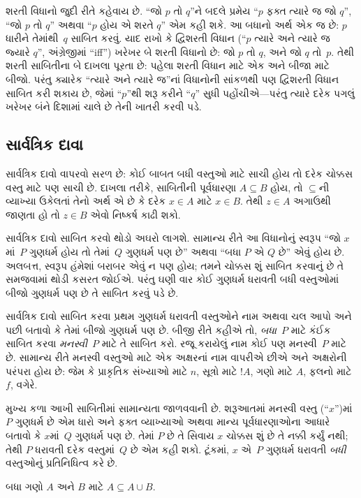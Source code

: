 શરતી વિધાનો જુદી રીતે કહેવાય છે. ``જો $p$ તો $q$''ને બદલે
પ્રમેય ``$p$ ફક્ત ત્યારે જ જો $q$'', ``જો $p$ તો $q$'' અથવા
``$p$ હોય એ શરતે $q$'' એમ કહી શકે. આ બધાનો અર્થ એક જ છે:
$p$ ધારીને તેમાંથી~$q$ સાબિત કરવું. યાદ રાખો કે દ્વિશરતી
વિધાન (``$p$ ત્યારે અને ત્યારે જ જ્યારે $q$'', અંગ્રેજીમાં ``iff'') ખરેખર બે
શરતી વિધાનો છે: જો $p$ તો $q$, અને જો $q$ તો~$p$. તેથી
શરતી સાબિતીના બે દાખલા પૂરતા છે: પહેલા શરતી વિધાન માટે એક
અને બીજા માટે બીજો. પરંતુ ક્યારેક ``ત્યારે અને ત્યારે જ''નાં
વિધાનોની સાંકળથી પણ દ્વિશરતી વિધાન સાબિત કરી શકાય છે, જેમાં
``$p$''થી શરૂ કરીને ``$q$'' સુધી પહોંચીએ---પરંતુ ત્યારે
દરેક પગલું ખરેખર બંને દિશામાં ચાલે છે તેની ખાતરી કરવી પડે.

\subsection{સાર્વત્રિક દાવા}

સાર્વત્રિક દાવો વાપરવો સરળ છે: કોઈ બાબત બધી વસ્તુઓ માટે
સાચી હોય તો દરેક ચોક્કસ વસ્તુ માટે પણ સાચી છે. દાખલા તરીકે,
સાબિતીની પૂર્વધારણા $A \subseteq B$ હોય, તો $\subseteq$ની
વ્યાખ્યા ઉકેલતાં તેનો અર્થ એ છે કે દરેક $x \in A$ માટે
$x \in B$. તેથી $z \in A$ અગાઉથી જાણતા હો તો
$z \in B$ એવો નિષ્કર્ષ કાઢી શકો.

સાર્વત્રિક દાવો સાબિત કરવો થોડો અઘરો લાગશે. સામાન્ય રીતે આ
વિધાનોનું સ્વરૂપ ``જો $x$માં~$P$ ગુણધર્મ હોય તો તેમાં~$Q$
ગુણધર્મ પણ છે'' અથવા ``બધા $P$ એ $Q$ છે'' એવું હોય છે.
અલબત્ત, સ્વરૂપ હંમેશાં બરાબર એવું ન પણ હોય; તમને ચોક્કસ
શું સાબિત કરવાનું છે તે સમજવામાં થોડી કસરત જોઈએ. પરંતુ ઘણી
વાર કોઈ ગુણધર્મ ધરાવતી બધી વસ્તુઓમાં બીજો ગુણધર્મ પણ છે તે
સાબિત કરવું પડે છે.

સાર્વત્રિક દાવો સાબિત કરવા પ્રથમ ગુણધર્મ ધરાવતી વસ્તુઓને નામ
અથવા ચલ આપો અને પછી બતાવો કે તેમાં બીજો ગુણધર્મ પણ છે.
બીજી રીતે કહીએ તો, \emph{બધા}~$P$ માટે કંઈક સાબિત કરવા
\emph{મનસ્વી}~$P$ માટે તે સાબિત કરો. રજૂ કરાયેલું નામ કોઈ
પણ મનસ્વી~$P$ માટે છે. સામાન્ય રીતે મનસ્વી વસ્તુઓ માટે
એક અક્ષરનાં નામ વાપરીએ છીએ અને અક્ષરોની પરંપરા હોય છે:
જેમ કે પ્રાકૃતિક સંખ્યાઓ માટે $n$, સૂત્રો માટે $!A$,
ગણો માટે $A$, ફલનો માટે $f$, વગેરે.

મુખ્ય કળા આખી સાબિતીમાં સામાન્યતા જાળવવાની છે. શરૂઆતમાં મનસ્વી
વસ્તુ (``$x$'')માં~$P$ ગુણધર્મ છે એમ ધારો અને ફક્ત વ્યાખ્યાઓ
અથવા માન્ય પૂર્વધારણાઓના આધારે બતાવો કે $x$માં~$Q$ ગુણધર્મ
પણ છે. તેમાં $P$ છે તે સિવાય $x$ ચોક્કસ શું છે તે નક્કી
કર્યું નથી; તેથી $P$ ધરાવતી દરેક વસ્તુમાં~$Q$ છે એમ કહી
શકો. ટૂંકમાં, $x$ એ~$P$ ગુણધર્મ ધરાવતી \emph{બધી} વસ્તુઓનું
પ્રતિનિધિત્વ કરે છે.

\begin{prop}
  બધા ગણો $A$ અને $B$ માટે $A \subseteq A \cup B$.
\end{prop}

